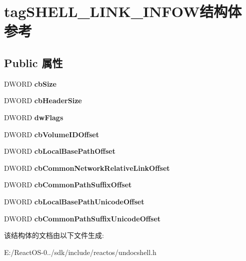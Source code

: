 \hypertarget{structtag_s_h_e_l_l___l_i_n_k___i_n_f_o_w}{}\section{tag\+S\+H\+E\+L\+L\+\_\+\+L\+I\+N\+K\+\_\+\+I\+N\+F\+O\+W结构体 参考}
\label{structtag_s_h_e_l_l___l_i_n_k___i_n_f_o_w}
\subsection*{Public 属性}
\begin{DoxyCompactItemize}
\item 
\mbox{\label{structtag_s_h_e_l_l___l_i_n_k___i_n_f_o_w_a9a3411fc7aea0af0231546ae38b908d5}} 
D\+W\+O\+RD {\bfseries cb\+Size}
\item 
\mbox{\label{structtag_s_h_e_l_l___l_i_n_k___i_n_f_o_w_aaaa4e09d5546cbb650eedb10f07ac552}} 
D\+W\+O\+RD {\bfseries cb\+Header\+Size}
\item 
\mbox{\label{structtag_s_h_e_l_l___l_i_n_k___i_n_f_o_w_ab76f7eed3c930b0812b0ea9e16e0431e}} 
D\+W\+O\+RD {\bfseries dw\+Flags}
\item 
\mbox{\label{structtag_s_h_e_l_l___l_i_n_k___i_n_f_o_w_a486ef40dd39c94a2094aa5070a553cd8}} 
D\+W\+O\+RD {\bfseries cb\+Volume\+I\+D\+Offset}
\item 
\mbox{\label{structtag_s_h_e_l_l___l_i_n_k___i_n_f_o_w_ade71aff5b9c886371b3fb1d539f51f5c}} 
D\+W\+O\+RD {\bfseries cb\+Local\+Base\+Path\+Offset}
\item 
\mbox{\label{structtag_s_h_e_l_l___l_i_n_k___i_n_f_o_w_a9a3379ab4b6cd9f169248a93a301c4b5}} 
D\+W\+O\+RD {\bfseries cb\+Common\+Network\+Relative\+Link\+Offset}
\item 
\mbox{\label{structtag_s_h_e_l_l___l_i_n_k___i_n_f_o_w_a56bece821c3fdc42820fe2b314fffa09}} 
D\+W\+O\+RD {\bfseries cb\+Common\+Path\+Suffix\+Offset}
\item 
\mbox{\label{structtag_s_h_e_l_l___l_i_n_k___i_n_f_o_w_a1ed82ecf4d1e013503fc08f786178246}} 
D\+W\+O\+RD {\bfseries cb\+Local\+Base\+Path\+Unicode\+Offset}
\item 
\mbox{\label{structtag_s_h_e_l_l___l_i_n_k___i_n_f_o_w_a6b9f29bfd70a7d20a0d899b164434f43}} 
D\+W\+O\+RD {\bfseries cb\+Common\+Path\+Suffix\+Unicode\+Offset}
\end{DoxyCompactItemize}


该结构体的文档由以下文件生成\+:\begin{DoxyCompactItemize}
\item 
E\+:/\+React\+O\+S-\/0../sdk/include/reactos/undocshell.\+h\end{DoxyCompactItemize}

